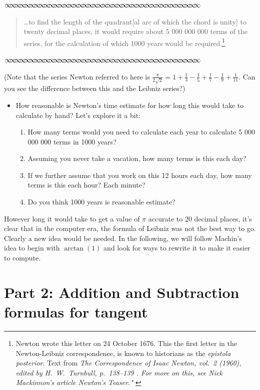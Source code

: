 \documentclass[11pt]{article}
\newcommand{\sep}{\vspace{-3pt}
\begin{center}
{\mathversion{normal}
$\infty \mspace{-5.5mu}\infty \mspace{-5.5mu}\infty \mspace{-5.5mu}\infty \mspace{-5.5mu}
\infty \mspace{-5.5mu}\infty \mspace{-5.5mu}\infty \mspace{-5.5mu}\infty \mspace{-5.5mu}
\infty \mspace{-5.5mu}\infty \mspace{-5.5mu}\infty \mspace{-5.5mu}\infty \mspace{-5.5mu}
\infty \mspace{-5.5mu}\infty \mspace{-5.5mu}\infty \mspace{-5.5mu}\infty \mspace{-5.5mu}
\infty \mspace{-5.5mu}\infty \mspace{-5.5mu}\infty \mspace{-5.5mu}\infty \mspace{-5.5mu}
\infty \mspace{-5.5mu}\infty \mspace{-5.5mu}\infty \mspace{-5.5mu}\infty \mspace{-5.5mu}
\infty \mspace{-5.5mu}\infty \mspace{-5.5mu}\infty \mspace{-5.5mu}\infty \mspace{-5.5mu}
\infty \mspace{-5.5mu}\infty \mspace{-5.5mu}\infty \mspace{-5.5mu}\infty \mspace{-5.5mu}
\infty \mspace{-5.5mu}\infty \mspace{-5.5mu}\infty \mspace{-5.5mu}\infty \mspace{-5.5mu}
\infty \mspace{-5.5mu}\infty \mspace{-5.5mu}\infty \mspace{-5.5mu}\infty \mspace{-5.5mu}$}
\end{center} \vspace*{-5pt}}
\newenvironment{source}%
 {\bigskip \sep \vspace*{-6pt} \begin{quote}
          \begin{sf}   }
   {   \end{sf}     \end{quote} \vspace*{-6pt} \sep \bigskip}%
\newcounter{tasknumb}
\newcommand{\tasknumb}{\stepcounter{tasknumb}\textmd{\textbf{$\fbox{$\fbox{Task \thetasknumb}$}$}}}
\newenvironment{task}%
 {\begin{itemize}
 \item[\tasknumb]  }
{
    \end{itemize}    }%
\begin{document}
\begin{source}
\vspace*{-6pt}
\ldots to find the length of the quadrant[al arc of which the chord is unity] to twenty decimal places, it would require about
5 000 000 000 terms of the series, for the calculation of which 1000 years would be required.\footnote{
Newton wrote this letter on 24 October 1676.  This the first letter in the Newton-Leibniz correspondence, is known to historians as the {\em epistola posterior}. Text from \em{ The Correspondence of Isaac Newton}, vol.\ 2 (1960), edited by H.\ W.\ Turnbull, p.\ 138--139 \cite{CorrNewton}. For more on this, see
Nick Mackinnon's article Newton's Teaser." \cite{M92}}
\vspace*{-8pt}
\end{source}

(Note that the series Newton referred to here is $\frac{\pi}{2\sqrt{2}} = 1 + \frac{1}{3} - \frac{1}{5} + \frac{1}{7} - \frac{1}{9} + \frac{1}{11}$. Can you see the difference between this and the Leibniz series?)
\begin{task}
How reasonable is Newton's time estimate for how long this would take to calculate by hand?  Let's explore it a bit:
\begin{enumerate}
\item[a.] How many terms would you need to calculate each year to calculate 5 000 000 000 terms in 1000 years?
\item[b.] Assuming you never take a vacation, how many terms is this each day?
\item[c.] If we further assume that you work on this 12 hours each day, how many terms is this each hour?  Each minute?
\item[d.] Do you think 1000 years is reasonable estimate?
\end{enumerate}
\end{task}

However long it would take to get a value of $\pi$ accurate to $20$ decimal places, it's clear that in the computer era, the formula of Leibniz was not the best way to go.  Clearly a new idea would be needed.  In the following, we will follow Machin's idea to begin with $\arctan(1)$ and look for ways to rewrite it to make it easier to compute.

\section*{Part 2: Addition and Subtraction formulas for tangent}
\end{document}
